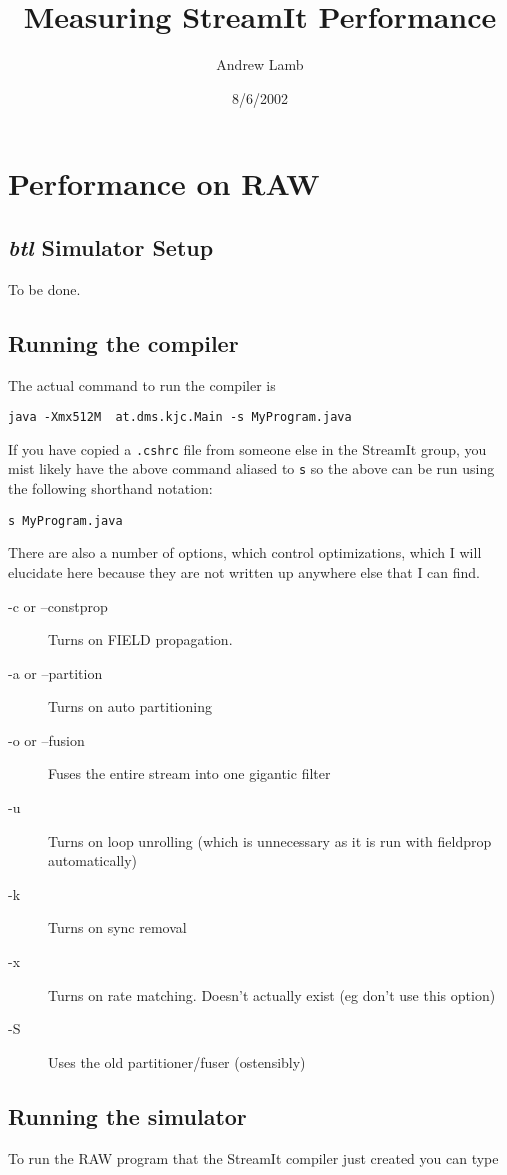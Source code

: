 \documentclass{article}
\title{Measuring StreamIt Performance}
\author{Andrew Lamb}
\date{8/6/2002}
\begin{document}
\maketitle
\newpage



\section{Performance on RAW}
\subsection{\textit{btl} Simulator Setup}
To be done.

\subsection{Running the compiler}
The actual command to run the compiler is 
\begin{verbatim}java -Xmx512M  at.dms.kjc.Main -s MyProgram.java\end{verbatim}

If you have copied a \texttt{.cshrc} file from someone else in the
StreamIt group, you mist likely have the above command aliased to \texttt{s}
so the above can be run using the following shorthand notation:
\begin{verbatim}s MyProgram.java\end{verbatim}

There are also a number of options, which control optimizations,
which I will elucidate here because they are not written up anywhere
else that I can find.
\begin{description}
\item [-c or --constprop] Turns on FIELD propagation.
\item [-a or --partition] Turns on auto partitioning
\item [-o or --fusion] Fuses the entire stream into one gigantic filter
\item [-u] Turns on loop unrolling (which is unnecessary as it is run with fieldprop automatically)
\item [-k] Turns on sync removal
\item [-x] Turns on rate matching. Doesn't actually exist (eg don't use this option)
\item [-S] Uses the old partitioner/fuser (ostensibly)
\end{description}


\subsection{Running the simulator}
To run the RAW program that the StreamIt compiler just created
you can type 
\end{document}
